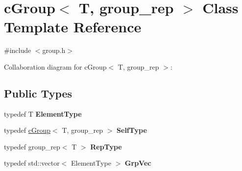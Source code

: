 \hypertarget{classcGroup}{\section{c\-Group$<$ T, group\-\_\-rep $>$ Class Template Reference}
\label{classcGroup}
}


{\ttfamily \#include $<$group.\-h$>$}



Collaboration diagram for c\-Group$<$ T, group\-\_\-rep $>$\-:
\subsection*{Public Types}
\begin{DoxyCompactItemize}
\item 
\hypertarget{classcGroup_abf5ed8f308bc05dbbb75b1f2ccb3bf18}{typedef T {\bfseries Element\-Type}}\label{classcGroup_abf5ed8f308bc05dbbb75b1f2ccb3bf18}

\item 
\hypertarget{classcGroup_a8c16d6d9eb0d68d286505528c1e94d3a}{typedef \hyperlink{classcGroup}{c\-Group}$<$ T, group\-\_\-rep $>$ {\bfseries Self\-Type}}\label{classcGroup_a8c16d6d9eb0d68d286505528c1e94d3a}

\item 
\hypertarget{classcGroup_a8752843a8e5c6d23411de90d4e1a1f51}{typedef group\-\_\-rep$<$ T $>$ {\bfseries Rep\-Type}}\label{classcGroup_a8752843a8e5c6d23411de90d4e1a1f51}

\item 
\hypertarget{classcGroup_aa233178cfb06c6c59df798ff40fce156}{typedef std\-::vector$<$ Element\-Type $>$ {\bfseries Grp\-Vec}}\label{classcGroup_aa233178cfb06c6c59df798ff40fce156}

\end{DoxyCompactItemize}
